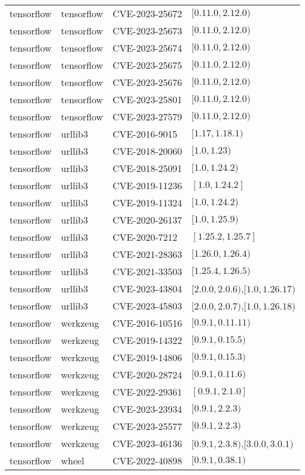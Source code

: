 \begin{tabular}{llll}
tensorflow & tensorflow & CVE-2023-25672 & $[0.11.0,2.12.0)$ \\
tensorflow & tensorflow & CVE-2023-25673 & $[0.11.0,2.12.0)$ \\
tensorflow & tensorflow & CVE-2023-25674 & $[0.11.0,2.12.0)$ \\
tensorflow & tensorflow & CVE-2023-25675 & $[0.11.0,2.12.0)$ \\
tensorflow & tensorflow & CVE-2023-25676 & $[0.11.0,2.12.0)$ \\
tensorflow & tensorflow & CVE-2023-25801 & $[0.11.0,2.12.0)$ \\
tensorflow & tensorflow & CVE-2023-27579 & $[0.11.0,2.12.0)$ \\
tensorflow & urllib3 & CVE-2016-9015 & $[1.17,1.18.1)$ \\
tensorflow & urllib3 & CVE-2018-20060 & $[1.0,1.23)$ \\
tensorflow & urllib3 & CVE-2018-25091 & $[1.0,1.24.2)$ \\
tensorflow & urllib3 & CVE-2019-11236 & $[1.0,1.24.2]$ \\
tensorflow & urllib3 & CVE-2019-11324 & $[1.0,1.24.2)$ \\
tensorflow & urllib3 & CVE-2020-26137 & $[1.0,1.25.9)$ \\
tensorflow & urllib3 & CVE-2020-7212 & $[1.25.2,1.25.7]$ \\
tensorflow & urllib3 & CVE-2021-28363 & $[1.26.0,1.26.4)$ \\
tensorflow & urllib3 & CVE-2021-33503 & $[1.25.4,1.26.5)$ \\
tensorflow & urllib3 & CVE-2023-43804 & $[2.0.0,2.0.6)$,$[1.0,1.26.17)$ \\
tensorflow & urllib3 & CVE-2023-45803 & $[2.0.0,2.0.7)$,$[1.0,1.26.18)$ \\
tensorflow & werkzeug & CVE-2016-10516 & $[0.9.1,0.11.11)$ \\
tensorflow & werkzeug & CVE-2019-14322 & $[0.9.1,0.15.5)$ \\
tensorflow & werkzeug & CVE-2019-14806 & $[0.9.1,0.15.3)$ \\
tensorflow & werkzeug & CVE-2020-28724 & $[0.9.1,0.11.6)$ \\
tensorflow & werkzeug & CVE-2022-29361 & $[0.9.1,2.1.0]$ \\
tensorflow & werkzeug & CVE-2023-23934 & $[0.9.1,2.2.3)$ \\
tensorflow & werkzeug & CVE-2023-25577 & $[0.9.1,2.2.3)$ \\
tensorflow & werkzeug & CVE-2023-46136 & $[0.9.1,2.3.8)$,$[3.0.0,3.0.1)$ \\
tensorflow & wheel & CVE-2022-40898 & $[0.9.1,0.38.1)$ \\
\bottomrule
\end{tabular}

